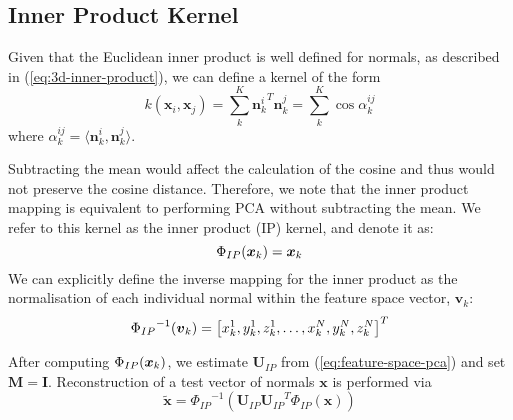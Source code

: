 \subsection{Inner Product Kernel}\label{subsec:ip-kernel}
Given that the Euclidean inner product is well defined for normals, as described in (\ref{eq:3d-inner-product}), we can define a kernel of the form
\begin{equation}\label{eq:ip-cosine-kernel}
    k(\boldsymbol{x}_i, \boldsymbol{x}_j) = \sum^K_k {\boldsymbol{n}_k^i}^T \boldsymbol{n}_k^j = \sum^K_k \cos \alpha^{ij}_k
\end{equation}
where $\alpha^{ij}_k = \langle \boldsymbol{n}^i_k, \boldsymbol{n}^j_k \rangle$.

Subtracting the mean would affect the calculation of the cosine and thus would not preserve the cosine distance. Therefore, we note that the inner product mapping is equivalent to performing PCA without subtracting the mean. We refer to this kernel as the inner product (IP) kernel, and denote it as:
\begin{equation}\label{eq:ip-kernel}
    \ip = \boldsymbol{x}_k
\end{equation}
We can explicitly define the inverse mapping for the inner product as the normalisation of each individual normal within the feature space vector, $\boldsymbol{v}_k$:
\begin{equation}\label{eq:inv-ip-kernel}
    \invip = \left[ x_k^1, y_k^1, z_k^1, \ldots, x_k^N, y_k^N, z_k^N \right]^T
\end{equation}

After computing $\Phi_{IP}(\boldsymbol{x}_k)$, we estimate $\boldsymbol{U}_{IP}$ from (\ref{eq:feature-space-pca}) and set $\boldsymbol{M} = \boldsymbol{I}$. Reconstruction of a test vector of normals $\boldsymbol{x}$ is performed via
\begin{equation}\label{eq:ip-reconstruction}
   \tilde{\boldsymbol{x}} = {\Phi_{IP}}^{-1} \left( \boldsymbol{U}_{IP} {\boldsymbol{U}_{IP}}^T \Phi_{IP}(\boldsymbol{x}) \right)
\end{equation}
